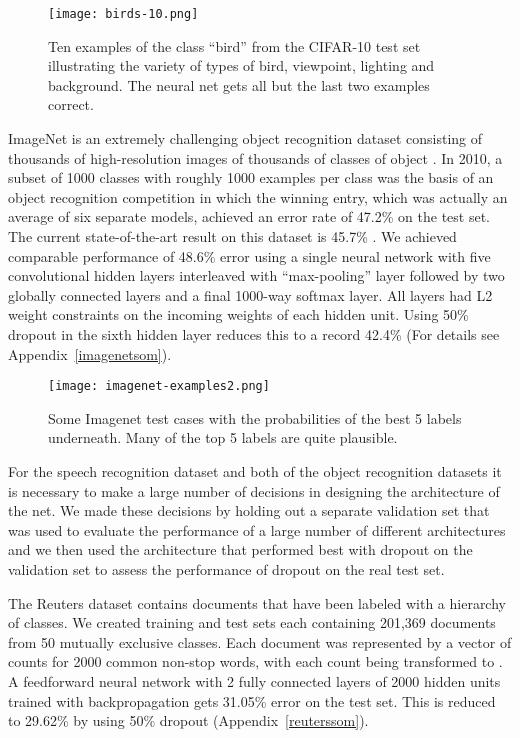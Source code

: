 \documentclass[12pt]{article}
\begin{document}
\begin{figure}[t]
\centerline{\texttt{[image: birds-10.png]}}
\caption{Ten examples of the class ``bird'' from the CIFAR-10 test set illustrating the
  variety of types of bird, viewpoint, lighting and background. The neural net gets all
  but the last two examples correct.}
\label{fig:cifar}
\end{figure}

ImageNet is an extremely challenging object recognition dataset consisting of thousands of
high-resolution images of thousands of classes of object \cite{Imagenet}. In 2010, a
subset of 1000 classes with roughly 1000 examples per class was the basis of an object
recognition competition in which the winning entry, which was actually an average of six
separate models, achieved an error rate of 47.2\% on the test set. The current state-of-the-art 
result on this dataset is 45.7\% \cite{winner45}. We achieved comparable performance of 
48.6\% error using a single neural
network with five convolutional hidden layers interleaved with ``max-pooling''
layer followed by two globally connected layers and a final
1000-way softmax layer. All layers had L2 weight constraints on the incoming weights of
each hidden unit. Using 50\% dropout in the sixth hidden layer reduces this to a record
42.4\% (For details see Appendix~\ref{imagenetsom}).

\begin{figure}[b]
\centerline{\texttt{[image: imagenet-examples2.png]}}
\caption{Some Imagenet test cases with the probabilities of the best 5 labels
  underneath. Many of the top 5 labels are quite plausible.}
\label{fig:imagenet}
\end{figure}


For the speech recognition dataset and both of the object recognition datasets it is
necessary to make a large number of decisions in designing the architecture of the net. We
made these decisions by holding out a separate validation set that was used to evaluate
the performance of a large number of different architectures and we then used the
architecture that performed best with dropout on the validation set to assess the
performance of dropout on the real test set. 

The Reuters dataset contains documents that have been labeled with a hierarchy of 
classes. We created training and test sets each containing 201,369 documents from 50 mutually
exclusive classes. Each document was represented by a vector of counts for 2000 common
non-stop words, with each count  being transformed to . A feedforward neural
network with 2 fully connected layers of 2000 hidden units trained with backpropagation
gets 31.05\% error on the test set. This is reduced to 29.62\% by using 50\% dropout (Appendix~\ref{reuterssom}).
\end{document}
